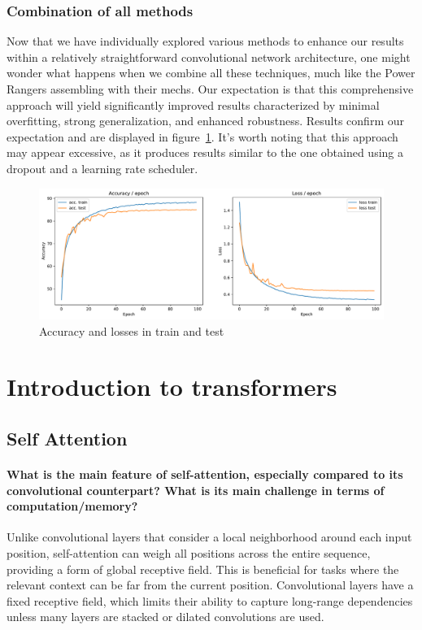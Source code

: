 \documentclass{article}
\theoremstyle{plain}%
\theoremstyle{definition}
\theoremstyle{remark}
\begin{document}
\subsubsection{Combination of all methods}
Now that we have individually explored various methods to enhance our results within a relatively straightforward convolutional network architecture, one might wonder what happens when we combine all these techniques, much like the Power Rangers assembling with their mechs. Our expectation is that this comprehensive approach will yield significantly improved results characterized by minimal overfitting, strong generalization, and enhanced robustness. Results confirm our expectation and are displayed in figure~\ref{fig:combined}. It's worth noting that this approach may appear excessive, as it produces results similar to the one obtained using a dropout and a learning rate scheduler.

\begin{figure}[H]
    \centering
    \includegraphics*[width=\textwidth]{figs/CNN/combined.pdf}
    \caption{Accuracy and losses in train and test}
    \label{fig:combined}
\end{figure}




\section{Introduction to transformers}
\subsection{Self Attention}
\paragraph{What is the main feature of self-attention, especially compared to its convolutional counterpart? What is its main challenge in terms of computation/memory?}
Unlike convolutional layers that consider a local neighborhood around each input position, self-attention can weigh all positions across the entire sequence, providing a form of global receptive field. This is beneficial for tasks where the relevant context can be far from the current position. Convolutional layers have a fixed receptive field, which limits their ability to capture long-range dependencies unless many layers are stacked or dilated convolutions are used. 
\end{document}
